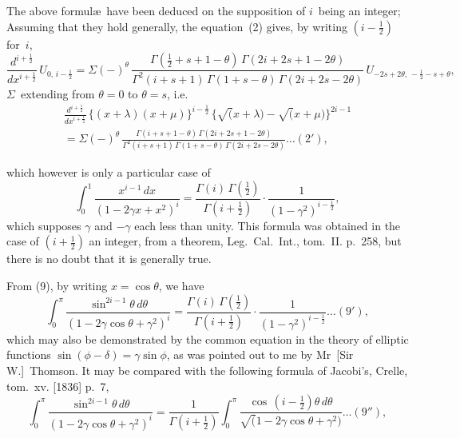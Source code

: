 \documentclass[11pt,a4paper]{book}
\begin{document}
The above formul\ae\ have been deduced on the supposition of $i$~being an integer; Assuming that they hold generally, the equation~(2) gives, by writing $(i-\frac{1}{2})$ for~$i$,
\[
\frac{d^{i+\frac{1}{2}}}{dx^{i+\frac{1}{2}}} \, U_{0,\,i-\frac{1}{2}} = \Sigma (-)^\theta \, \frac{\Gamma(\frac{1}{2}+s+1-\theta)\,\Gamma(2i+2s+1-2\theta)}{\Gamma^2(i+s+1)\,\Gamma(1+s-\theta)\,\Gamma(2i+2s-2\theta)} \, U_{-2s+2\theta,\, -\frac{1}{2}-s+\theta},
\]
$\Sigma$~extending from $\theta=0$ to $\theta=s$, i.e.
\begin{multline*}
\frac{d^{i+\frac{1}{2}}}{dx^{i+\frac{1}{2}}} \, \{(x+\lambda)(x+\mu)\}^{i-\frac{1}{2}} \, \{\surd(x+\lambda) - \surd(x+\mu)\}^{2i-1} \\
= \Sigma (-)^\theta \, \frac{\Gamma(i+s+1-\theta)\,\Gamma(2i+2s+1-2\theta)}{\Gamma^2(i+s+1)\,\Gamma(1+s-\theta)\,\Gamma(2i+2s-2\theta)} \ldots(2'),
\end{multline*}

\newpage
which however is only a particular case of
\[
\int_0^1 \frac{x^{i-1}\,dx}{(1-2\gamma x + x^2)^i} = \frac{\Gamma(i)\,\Gamma(\frac{1}{2})}{\Gamma(i+\frac{1}{2})} \cdot \frac{1}{(1-\gamma^2)^{i-\frac{1}{2}}},
\]
which supposes $\gamma$ and $-\gamma$ each less than unity. This formula was obtained in the case of $(i+\frac{1}{2})$ an integer, from a theorem, Leg.\ Cal.\ Int., tom.~II. p.~258, but there is no doubt that it is generally true.

From (9), by writing $x = \cos\theta$, we have
\[
\int_0^\pi \frac{\sin^{2i-1}\theta\,d\theta}{(1-2\gamma\cos\theta + \gamma^2)^i} = \frac{\Gamma(i)\,\Gamma(\frac{1}{2})}{\Gamma(i+\frac{1}{2})} \cdot \frac{1}{(1-\gamma^2)^{i-\frac{1}{2}}} \ldots(9'),
\]
which may also be demonstrated by the common equation in the theory of elliptic functions $\sin(\phi-\delta) = \gamma\sin\phi$, as was pointed out to me by Mr~[Sir W.]~Thomson. It may be compared with the following formula of Jacobi's, Crelle, tom.~xv. [1836] p.~7,
\[
\int_0^\pi \frac{\sin^{2i-1}\theta\,d\theta}{(1-2\gamma\cos\theta + \gamma^2)^i} = \frac{1}{\Gamma(i+\frac{1}{2})} \int_0^\pi \frac{\cos\,(i-\frac{1}{2})\theta\,d\theta}{\surd(1-2\gamma\cos\theta + \gamma^2)} \ldots(9''),
\]
\end{document}
